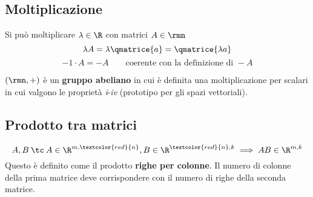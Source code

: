 \documentclass[twoside, 11pt, titlepage]{article}
\begin{document}
\subsection{Moltiplicazione}

Si può moltiplicare $\lambda \in \R$ con matrici $A\in\rmn$
\[
\lambda A=\lambda\qmatrice{a}=\qmatrice{\lambda a}
\]
\[
-1\cdot A = -A\qquad\text{coerente con la definizione di }-A
\]

\esempio{
\[
2\begin{pmatrix}
3 & 1 & 0\\
-1 & 4 & 1
\end{pmatrix}=\begin{pmatrix}
6 & 2 & 0\\
-2 & 8 & 2
\end{pmatrix}
\]
}



$(\rmn, +)$ è un \textbf{gruppo abeliano} in cui è definita una moltiplicazione per scalari in cui valgono le proprietà \textit{i}-\textit{iv} (prototipo per gli spazi vettoriali).

\subsection{Prodotto tra matrici}
\[
A,B\:\tc\: A\in\R^{m,\textcolor{red}{n}}, B\in\R^{\textcolor{red}{n}, k}\implies AB\in \R^{m, k}
\]
Questo è definito come il prodotto \textbf{righe per colonne}. Il numero di colonne della prima matrice deve corrispondere con il numero di righe della seconda matrice.


\end{document}
